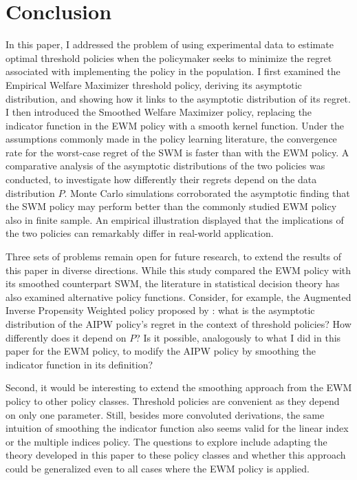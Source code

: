 {\section{Conclusion} \label{sec:conclusion}

In this paper, I addressed the problem of using experimental data to estimate optimal threshold policies when the policymaker seeks to minimize the regret associated with implementing the policy in the population. I first examined the Empirical Welfare Maximizer threshold policy, deriving its asymptotic distribution, and showing how it links to the asymptotic distribution of its regret. I then introduced the Smoothed Welfare Maximizer policy, replacing the indicator function in the EWM policy with a smooth kernel function. Under the assumptions commonly made in the policy learning literature, the convergence rate for the worst-case regret of the SWM is faster than with the EWM policy. A comparative analysis of the asymptotic distributions of the two policies was conducted, to investigate how differently their regrets depend on the data distribution $P$. Monte Carlo simulations corroborated the asymptotic finding that the SWM policy may perform better than the commonly studied EWM policy also in finite sample. An empirical illustration displayed that the implications of the two policies can remarkably differ in real-world application.

Three sets of problems remain open for future research, to extend the results of this paper in diverse directions. While this study compared the EWM policy with its smoothed counterpart SWM, the literature in statistical decision theory has also examined alternative policy functions. Consider, for example, the Augmented Inverse Propensity Weighted policy proposed by \cite{athey2021policy}: what is the asymptotic distribution of the AIPW policy's regret in the context of threshold policies? How differently does it depend on $P$? Is it possible, analogously to what I did in this paper for the EWM policy, to modify the AIPW policy by smoothing the indicator function in its definition?

Second, it would be interesting to extend the smoothing approach from the EWM policy to other policy classes. Threshold policies are convenient as they depend on only one parameter. Still, besides more convoluted derivations, the same intuition of smoothing the indicator function also seems valid for the linear index or the multiple indices policy. The questions to explore include adapting the theory developed in this paper to these policy classes and whether this approach could be generalized even to all cases where the EWM policy is applied.

}
